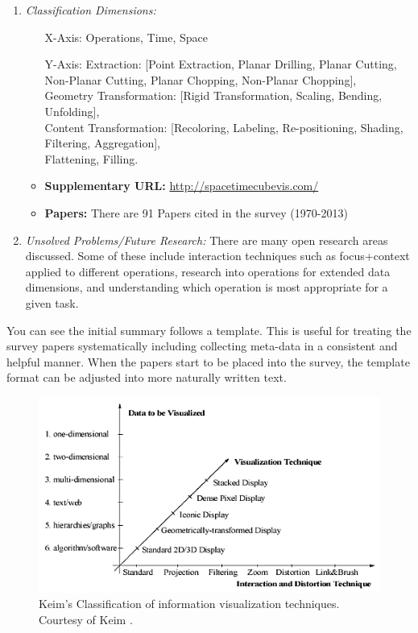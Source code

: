 \begin{footnotesize}
\begin{enumerate}
\item \textit{Classification Dimensions:}
\begin{itemize}
\item[X-Axis:] Operations, Time, Space
\item[Y-Axis:] Extraction: [Point Extraction, Planar Drilling, Planar Cutting, Non-Planar Cutting, Planar Chopping, Non-Planar Chopping],\\
Geometry Transformation: [Rigid Transformation, Scaling, Bending, Unfolding],\\ 
Content Transformation: [Recoloring, Labeling, Re-positioning, Shading, Filtering, Aggregation],\\
Flattening, Filling.
\item \textbf{Supplementary URL:} \url{http://spacetimecubevis.com/}
\item \textbf{Papers:} There are 91 Papers cited in the survey (1970-2013)\\
\end{itemize}

\item \textit{Unsolved Problems/Future Research:}
There are many open research areas discussed. Some of these include interaction techniques such as focus+context applied to different operations, research into operations for extended data dimensions, and understanding which operation is most appropriate for a given task.

\end{enumerate}
\end{footnotesize}

You can see the initial summary follows a template. This is useful for treating the survey papers systematically including collecting meta-data in a consistent and helpful manner. When the papers start to be placed into the survey, the template format can be adjusted into  more naturally written text.

\begin{figure}
\centering
\includegraphics[width=1\linewidth]{pictures/techniquetaxonomy.png}
\caption{Keim's 
Classification of information visualization techniques. Courtesy of Keim \cite{keim2002information}. } \label{fig:keim}
\end{figure} 


